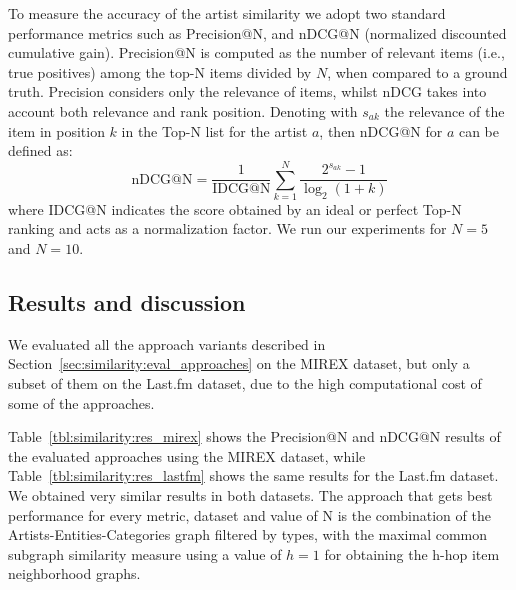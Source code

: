 To measure the accuracy of the artist similarity we adopt two standard performance metrics such as Precision@N, and nDCG@N (normalized discounted cumulative gain).
Precision@N is computed as the number of relevant items (i.e., true positives) among the top-N items divided by $N$, when compared to a ground truth.
Precision considers only the relevance of items, whilst nDCG takes into account both relevance and rank position. Denoting with  $s_{ak}$ the relevance of the item in position $k$ in the Top-N list for the artist $a$, then nDCG@N for $a$ can be defined as:
\begin{equation}\label{eq:recall}
\text{nDCG@N} = \frac{1 }{\text{IDCG@N}} \sum^N_{k=1} \frac{ 2^{ s_{ak}} -1 }{\log_2 (1+k)}
\end{equation}
where IDCG@N indicates the score obtained by an ideal or perfect Top-N ranking and acts as a normalization factor. We run our experiments for $N=5$ and $N=10$.

\subsection{Results and discussion} %
\label{sec:similarity:results}
We evaluated all the approach variants described in Section~\ref{sec:similarity:eval_approaches} on the MIREX dataset, but only a subset of them on the Last.fm dataset, due to the high computational cost of some of the approaches.

Table~\ref{tbl:similarity:res_mirex} shows the Precision@N and nDCG@N results of the evaluated approaches using the MIREX dataset, while Table~\ref{tbl:similarity:res_lastfm} shows the same results for the Last.fm dataset. We obtained very similar results in both datasets. The approach that gets best performance for every metric, dataset and value of N is the combination of the Artists-Entities-Categories graph filtered by types, with the maximal common subgraph similarity measure using a value of $h=1$ for obtaining the h-hop item neighborhood graphs.

